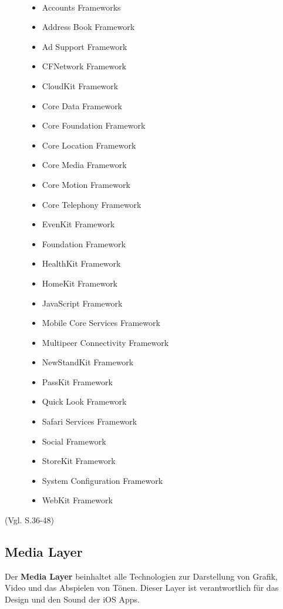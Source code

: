 \begin{description}	
	\item[\parbox{\textwidth} {Das Core Service Layer Framework beinhaltet folgende Frameworks}]~\par
	\begin{multicols}{2}
	\begin{itemize}
		\item Accounts Frameworks
		\item Address Book Framework
		\item Ad Support Framework
		\item CFNetwork Framework
		\item CloudKit Framework
		\item Core Data Framework
		\item Core Foundation Framework
		\item Core Location Framework
		\item Core Media Framework
		\item Core Motion Framework
		\item Core Telephony Framework
		\item EvenKit Framework
		\item Foundation Framework
		\item HealthKit Framework
		\item HomeKit Framework
		\item JavaScript Framework
		\item Mobile Core Services Framework
		\item Multipeer Connectivity Framework
		\item NewStandKit Framework
		\item PassKit Framework
		\item Quick Look Framework
		\item Safari Services Framework
		\item Social Framework
		\item StoreKit Framework
		\item System Configuration Framework
		\item WebKit Framework
	\end{itemize}
	\end{multicols}
\end{description}

(Vgl. \cite{Apple[6]} S.36-48)
\subsection{Media Layer}
\label{sec:MediaLayer}		
Der \textbf{Media Layer} beinhaltet alle Technologien zur Darstellung von Grafik, Video und das Abspielen von Tönen. Dieser Layer ist verantwortlich für das Design und den Sound der iOS Apps. 

